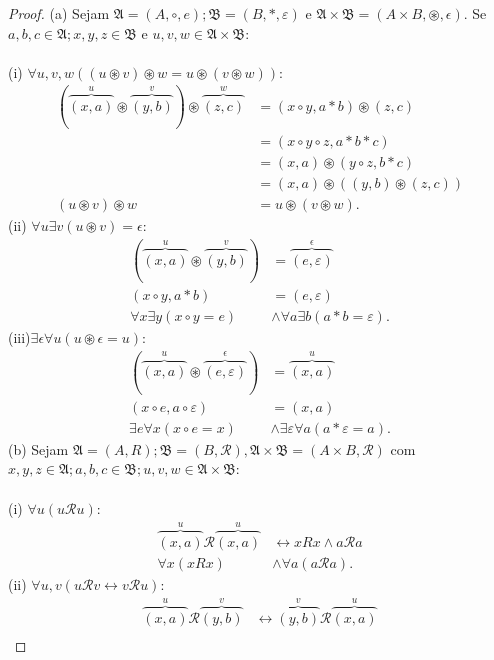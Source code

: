 \documentclass[11pt]{article}
\theoremstyle{definition}
\newcommand{\sse}{\leftrightarrow}
\newcommand{\mc}[1]{\mathcal{#1}}
\newcommand{\mf}[1]{\mathfrak{#1}}
\begin{document}
\begin{proof}
(a) Sejam $\mf{A}=(A,\circ,e);\mf{B}=(B,*,\varepsilon)$ e $\mf{A}\times\mf{B}=(A\times B,\circledast,\epsilon)$. Se $a,b,c\in\mf{A};x,y,z\in\mf{B}$ e $u,v,w\in\mf{A}\times\mf{B}$:\\\\
(i) $\forall u,v,w((u\circledast v)\circledast w = u\circledast(v\circledast w))$:
\begin{align*}
    (\overbrace{(x,a)}^u\circledast \overbrace{(y,b)}^v)\circledast \overbrace{(z,c)}^w & = (x\circ y,a*b)\circledast (z,c)\\
    & = (x\circ y\circ z,a*b*c)\\
    & = (x,a)\circledast(y\circ z,b*c)\\
    & = (x,a)\circledast((y,b)\circledast(z,c))\\
    (u\circledast v)\circledast w & = u\circledast(v\circledast w).
\end{align*}
(ii) $\forall u\exists v(u\circledast v)=\epsilon$:
\begin{align*}
    (\overbrace{(x,a)}^u\circledast\overbrace{(y,b)}^v) & = \overbrace{(e,\varepsilon)}^\epsilon\\
    (x\circ y,a*b) & =(e,\varepsilon)\\
    \forall x\exists y(x\circ y=e)& \wedge \forall a\exists b(a*b=\varepsilon).
\end{align*}
(iii)$\exists\epsilon\forall u(u\circledast\epsilon=u)$:
\begin{align*}
    (\overbrace{(x,a)}^u\circledast\overbrace{(e,\varepsilon)}^\epsilon) & =\overbrace{(x,a)}^u\\
    (x\circ e,a\circ\varepsilon) & = (x,a)\\
    \exists e\forall x(x\circ e=x) & \wedge \exists\varepsilon\forall a(a*\varepsilon=a).
\end{align*}
(b) Sejam $\mf{A}=(A,R);\mf{B}=(B,\mc{R}),\mf{A}\times\mf{B}=(A\times B,\mathscr{R})$ com $x,y,z\in\mf{A};a,b,c\in\mf{B};u,v,w\in\mf{A}\times\mf{B}$:\\\\
(i) $\forall u(u\mathscr{R}u)$:
\begin{align*}
    \overbrace{(x,a)}^u\mathscr{R}\overbrace{(x,a)}^u & \sse xRx\wedge a\mc{R}a\\
    \forall x(xRx) & \wedge \forall a(a\mc{R}a).
\end{align*}
(ii) $\forall u,v(u\mathscr{R}v\sse v\mathscr{R}u)$:
\begin{align*}
    \overbrace{(x,a)}^u\mathscr{R}\overbrace{(y,b)}^v & \sse \overbrace{(y,b)}^v\mathscr{R}\overbrace{(x,a)}^u\\

\end{align*}
\end{proof}
\end{document}
